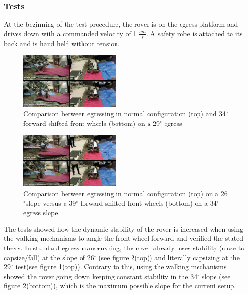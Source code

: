 \documentclass[a4paper,twocolumn]{esapub2005} %
\begin{document}
\subsubsection{Tests}

At the beginning of the test procedure, the rover is on the egress platform and drives down with a commanded velocity of 1 $\frac{cm}{s}$. A safety robe is attached to its back and is hand held without tension. 

\begin{figure}[h!]
	\centering		\includegraphics[width=0.45\textwidth]{egress29.png}	
	\caption{Comparison between egressing in normal configuration (top) and 34$^{\circ}$ forward shifted front wheels (bottom) on a 29$^{\circ}$ egress}
	\label{fig:egress29}
\end{figure}

\begin{figure}[h!]
	\centering		\includegraphics[width=0.45\textwidth]{egress34.png}	
	\caption{Comparison between egressing in normal configuration (top)  on a 26$^{\circ}$slope versus a 39$^{\circ}$ forward shifted front wheels (bottom) on a 34$^{\circ}$ egress slope}
	\label{fig:egress34}
\end{figure}

The tests showed how the dynamic stability of the rover is increased when using the walking mechanisms to angle the front wheel forward and verified the stated thesis.  In standard egress manoeuvring, the rover already loses stability (close to capsize/fall) at the slope of 26$^\circ$ (see figure \ref{fig:egress34}(top)) and literally capsizing at the 29$^\circ$ test(see figure \ref{fig:egress29}(top)). Contrary to this, using the walking mechanisms showed the rover going down keeping constant stability in the 34$^\circ$ slope (see figure \ref{fig:egress34}(bottom)), which is the maximum possible slope for the current setup. 
\end{document}
